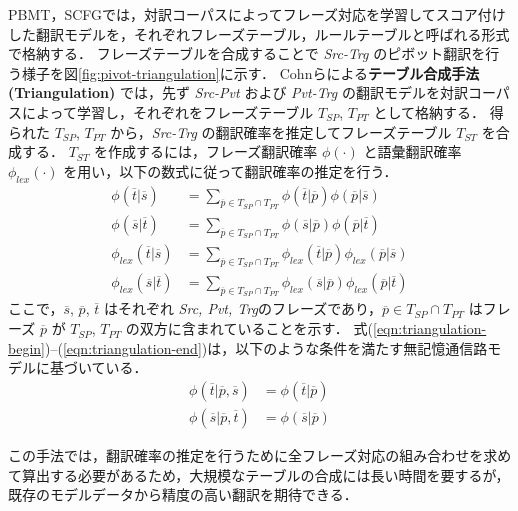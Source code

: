 \documentclass[japanese]{jnlp_1.4}
\begin{document}
PBMT，SCFGでは，対訳コーパスによってフレーズ対応を学習してスコア付けした翻訳モデルを，それぞれフレーズテーブル，ルールテーブルと呼ばれる形式で格納する．
フレーズテーブルを合成することで \textit{Src-Trg} のピボット翻訳を行う様子を図\ref{fig:pivot-triangulation}に示す．
Cohnらによる\textbf{テーブル合成手法 (Triangulation)} \cite{cohn07}では，先ず \textit{Src-Pvt} および \textit{Pvt-Trg} の翻訳モデルを対訳コーパスによって学習し，それぞれをフレーズテーブル $T_{SP}$, $T_{PT}$ として格納する．
得られた $T_{SP}$, $T_{PT}$ から，\textit{Src-Trg} の翻訳確率を推定してフレーズテーブル $T_{ST}$ を合成する．
$T_{ST}$ を作成するには，フレーズ翻訳確率 $\phi(\cdot)$ と語彙翻訳確率 $\phi_{lex}(\cdot)$ を用い，以下の数式に従って翻訳確率の推定を行う．
\begin{align}
\phi\left(\overline{t}|\overline{s}\right) & = \sum_{\overline{p} \in T_{SP} \cap T_{PT}} \phi\left(\overline{t}|\overline{p}\right) \phi\left(\overline{p}|\overline{s}\right) \label{eqn:triangulation-begin} \\
\phi\left(\overline{s}|\overline{t}\right) & = \sum_{\overline{p} \in T_{SP} \cap T_{PT}} \phi\left(\overline{s}|\overline{p}\right) \phi\left(\overline{p}|\overline{t}\right) \\
\phi_{lex}\left(\overline{t}|\overline{s}\right) & = \sum_{\overline{p} \in T_{SP} \cap T_{PT}} \phi_{lex}\left(\overline{t}|\overline{p}\right) \phi_{lex}\left(\overline{p}|\overline{s}\right) \\
\phi_{lex}\left(\overline{s}|\overline{t}\right) & = \sum_{\overline{p} \in T_{SP} \cap T_{PT}} \phi_{lex}\left(\overline{s}|\overline{p}\right) \phi_{lex}\left(\overline{p}|\overline{t}\right) \label{eqn:triangulation-end}
\end{align}
ここで，$\overline{s}$, $\overline{p}$, $\overline{t}$ はそれぞれ \textit{Src, Pvt, Trg}のフレーズであり，$\overline{p} \in T_{SP} \cap T_{PT}$ はフレーズ $\overline{p}$ が $T_{SP}$, $T_{PT}$ の双方に含まれていることを示す．
式(\ref{eqn:triangulation-begin})--(\ref{eqn:triangulation-end})は，以下のような条件を満たす無記憶通信路モデルに基づいている．
\begin{align}
\phi\left(\overline{t}|\overline{p},\overline{s}\right) & = \phi\left(\overline{t}|\overline{p}\right) \\
\phi\left(\overline{s}|\overline{p},\overline{t}\right) & = \phi\left(\overline{s}|\overline{p}\right)
\end{align}

この手法では，翻訳確率の推定を行うために全フレーズ対応の組み合わせを求めて算出する必要があるため，大規模なテーブルの合成には長い時間を要するが，既存のモデルデータから精度の高い翻訳を期待できる．
\end{document}
